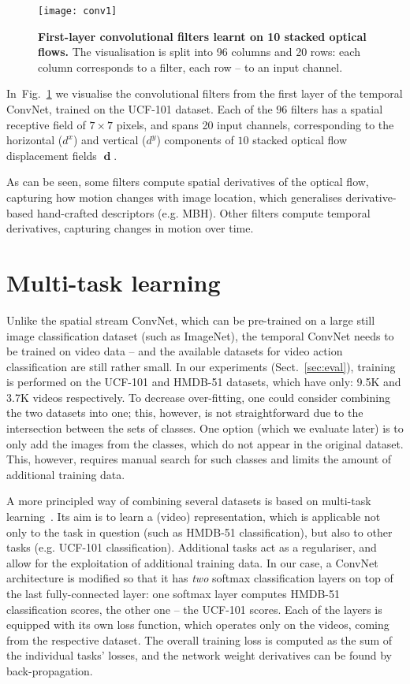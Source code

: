 \documentclass{article} \usepackage{nips14submit_e,times}
\makeatletter
\newcommand{\figref}[1]{Fig.~\ref{#1}}
\newcommand{\sref}[1]{Sect.~\ref{#1}}
\newcommand*{\eg}{e.g.\@\xspace}
\DeclareMathOperator{\dvec}{\mathrm{\textbf{d}}}
\makeatother
\begin{document}
\begin{figure}[ht]
\centering
\texttt{[image: conv1]}
\caption{\textbf{First-layer convolutional filters learnt on 10 stacked optical flows.}
The visualisation is split into 96 columns and 20 rows: each column corresponds to a filter, each row -- to an input channel.}
\label{fig:conv1}
\end{figure}
In~\figref{fig:conv1} we visualise the convolutional filters from the first layer of the temporal ConvNet, trained on the UCF-101 dataset.
Each of the $96$ filters has a spatial receptive field of $7 \times 7$ pixels, and spans 20 input channels, corresponding to the horizontal ($d^x$)
and vertical ($d^y$) components of $10$ stacked optical flow displacement fields $\dvec$.

As can be seen, some filters compute spatial derivatives of the optical flow, capturing how motion changes with image location, which generalises
derivative-based hand-crafted descriptors (\eg MBH).
Other filters compute temporal derivatives, capturing changes in motion over time.

\section{Multi-task learning}
\label{sec:multi}

Unlike the spatial stream ConvNet, which can be pre-trained on a large
still image classification dataset (such as ImageNet), the temporal
ConvNet needs to be trained on video data -- and the available datasets
for video action classification are still rather small.  In our experiments
(\sref{sec:eval}), training is performed on the UCF-101 and HMDB-51
datasets, which have only: 9.5K and 3.7K videos
respectively.  To decrease over-fitting, one could consider combining
the two datasets into one; this, however, is not straightforward due
to the intersection between the sets of classes. 
One option (which we evaluate later) is to only add the images from the classes, which do not appear in the original dataset.
This, however, requires manual search for such classes and limits the amount of additional training data.

A more principled way of combining several datasets is based on multi-task learning~\cite{Collobert08}.
Its aim is to learn a (video) representation, which is applicable not only to the task in question (such as HMDB-51 classification), but also
to other tasks (\eg UCF-101 classification). Additional tasks act as a regulariser, and allow for the exploitation of additional training data.
In our case, a ConvNet architecture is modified so that it has \emph{two} softmax classification layers on
top of the last fully-connected layer: one softmax layer computes HMDB-51 classification scores, the other one -- the UCF-101 scores. Each of the layers is equipped with
its own loss function, which operates only on the videos, coming from the respective dataset. The overall training loss is computed as the sum of the individual
tasks' losses, and the network weight derivatives can be found by back-propagation.
\end{document}
